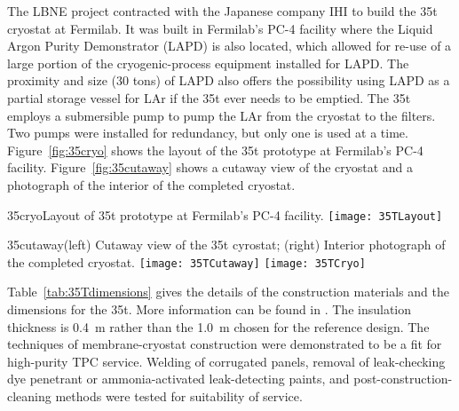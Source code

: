 The LBNE project contracted with the Japanese company IHI to build the 35t cryostat at Fermilab.  
It was built in Fermilab's PC-4 facility where the Liquid Argon Purity Demonstrator (LAPD)
\cite{bib:lapdP07005}
is also located, which
allowed for re-use of a large portion of the cryogenic-process equipment installed for LAPD.
The proximity and size (30 tons) of LAPD also offers the possibility using LAPD as 
a partial storage vessel for LAr if the 35t ever needs to be emptied. 
The 35t employs a submersible %
pump to pump the LAr from the cryostat to the filters. Two pumps were installed for redundancy, but 
only one is used at a time.
Figure~\ref{fig:35cryo} shows the layout of the 35t prototype at 
Fermilab's PC-4 facility. 
Figure~\ref{fig:35cutaway} shows a cutaway view of the cryostat and a photograph of the interior
of the completed cryostat. 

\begin{cdrfigure}{35cryo}{Layout of 35t prototype at Fermilab's PC-4 facility. }
\texttt{[image: 35TLayout]}
\end{cdrfigure}

\begin{cdrfigure}{35cutaway}{(left) Cutaway view of the 35t cyrostat; (right) Interior
photograph of the completed cryostat.}
\texttt{[image: 35TCutaway]}
\texttt{[image: 35TCryo]}
\end{cdrfigure}

Table~\ref{tab:35Tdimensions} gives the details of the construction materials and the
dimensions for the 35t.
More information can be found in
\cite{bib:membcryo1573}.
The insulation thickness is 0.4~m rather than the 1.0~m chosen for the reference design.  
The techniques of membrane-cryostat construction were demonstrated to be a fit 
for high-purity TPC service.
Welding of corrugated panels, removal of leak-checking dye penetrant or ammonia-activated
leak-detecting paints, and post-construction-cleaning methods were tested for suitability of service.  

